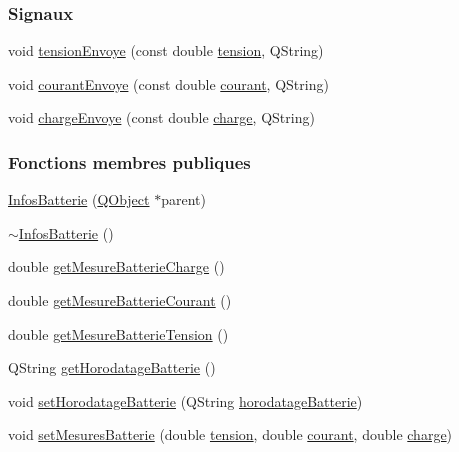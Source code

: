 \subsubsection*{Signaux}
\begin{DoxyCompactItemize}
\item 
void \hyperlink{class_infos_batterie_a932a48aafb94e5289d775bb3305fdb74}{tension\+Envoye} (const double \hyperlink{class_infos_batterie_a45d09805075337f7f2d4b84d02a2ee47}{tension}, Q\+String)
\item 
void \hyperlink{class_infos_batterie_a3b648bf48c796c64d90db29741889eb1}{courant\+Envoye} (const double \hyperlink{class_infos_batterie_a417f025b2ccddea7d28f80df4413945a}{courant}, Q\+String)
\item 
void \hyperlink{class_infos_batterie_a75ef2e971d86ae3b66a787d53e3d5c63}{charge\+Envoye} (const double \hyperlink{class_infos_batterie_af3ad72cdbbf13f2dec6d81f078a2c0d2}{charge}, Q\+String)
\end{DoxyCompactItemize}
\subsubsection*{Fonctions membres publiques}
\begin{DoxyCompactItemize}
\item 
\hyperlink{class_infos_batterie_a8dea33c2515f2c30ea3a525e17c03fa2}{Infos\+Batterie} (\hyperlink{class_q_object}{Q\+Object} $\ast$parent)
\item 
\hyperlink{class_infos_batterie_a5c59c1d607d25b46fb7c3768a01f4ec5}{$\sim$\+Infos\+Batterie} ()
\item 
double \hyperlink{class_infos_batterie_a8c37174d0d36e4f5ada9d16dd5894803}{get\+Mesure\+Batterie\+Charge} ()
\item 
double \hyperlink{class_infos_batterie_a17a55f19c132026091217c243bf402c0}{get\+Mesure\+Batterie\+Courant} ()
\item 
double \hyperlink{class_infos_batterie_a470b96c2fe1fab6a187c6d0997bd76a8}{get\+Mesure\+Batterie\+Tension} ()
\item 
Q\+String \hyperlink{class_infos_batterie_aeac9a7bcd953444f4f2302d7949c74ef}{get\+Horodatage\+Batterie} ()
\item 
void \hyperlink{class_infos_batterie_a1d98a79696389d0264959d0c8a64bbcd}{set\+Horodatage\+Batterie} (Q\+String \hyperlink{class_infos_batterie_a261067aff87023bccd60e59961ef1ffc}{horodatage\+Batterie})
\item 
void \hyperlink{class_infos_batterie_ab1b2945b7d7c1a6207e29369690a27b9}{set\+Mesures\+Batterie} (double \hyperlink{class_infos_batterie_a45d09805075337f7f2d4b84d02a2ee47}{tension}, double \hyperlink{class_infos_batterie_a417f025b2ccddea7d28f80df4413945a}{courant}, double \hyperlink{class_infos_batterie_af3ad72cdbbf13f2dec6d81f078a2c0d2}{charge})
\end{DoxyCompactItemize}
